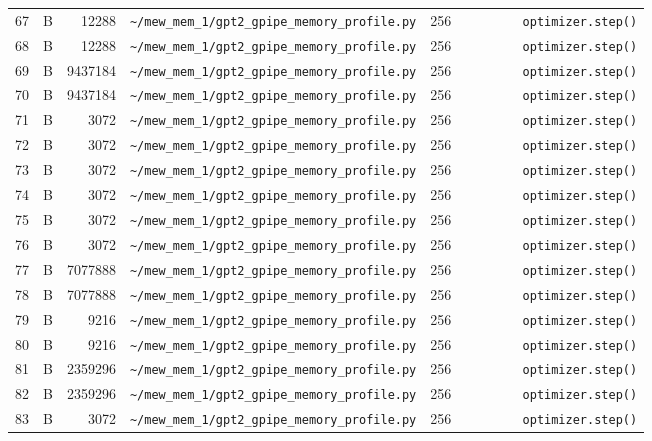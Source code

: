 \documentclass{article}
\begin{document}
\begin{longtable}{r l r p{6.5cm} r p{7.0cm}}
67 & B & 12288 & \lstinline|~/mew_mem_1/gpt2_gpipe_memory_profile.py| & 256 & \lstinline|        optimizer.step()| \\
68 & B & 12288 & \lstinline|~/mew_mem_1/gpt2_gpipe_memory_profile.py| & 256 & \lstinline|        optimizer.step()| \\
69 & B & 9437184 & \lstinline|~/mew_mem_1/gpt2_gpipe_memory_profile.py| & 256 & \lstinline|        optimizer.step()| \\
70 & B & 9437184 & \lstinline|~/mew_mem_1/gpt2_gpipe_memory_profile.py| & 256 & \lstinline|        optimizer.step()| \\
71 & B & 3072 & \lstinline|~/mew_mem_1/gpt2_gpipe_memory_profile.py| & 256 & \lstinline|        optimizer.step()| \\
72 & B & 3072 & \lstinline|~/mew_mem_1/gpt2_gpipe_memory_profile.py| & 256 & \lstinline|        optimizer.step()| \\
73 & B & 3072 & \lstinline|~/mew_mem_1/gpt2_gpipe_memory_profile.py| & 256 & \lstinline|        optimizer.step()| \\
74 & B & 3072 & \lstinline|~/mew_mem_1/gpt2_gpipe_memory_profile.py| & 256 & \lstinline|        optimizer.step()| \\
75 & B & 3072 & \lstinline|~/mew_mem_1/gpt2_gpipe_memory_profile.py| & 256 & \lstinline|        optimizer.step()| \\
76 & B & 3072 & \lstinline|~/mew_mem_1/gpt2_gpipe_memory_profile.py| & 256 & \lstinline|        optimizer.step()| \\
77 & B & 7077888 & \lstinline|~/mew_mem_1/gpt2_gpipe_memory_profile.py| & 256 & \lstinline|        optimizer.step()| \\
78 & B & 7077888 & \lstinline|~/mew_mem_1/gpt2_gpipe_memory_profile.py| & 256 & \lstinline|        optimizer.step()| \\
79 & B & 9216 & \lstinline|~/mew_mem_1/gpt2_gpipe_memory_profile.py| & 256 & \lstinline|        optimizer.step()| \\
80 & B & 9216 & \lstinline|~/mew_mem_1/gpt2_gpipe_memory_profile.py| & 256 & \lstinline|        optimizer.step()| \\
81 & B & 2359296 & \lstinline|~/mew_mem_1/gpt2_gpipe_memory_profile.py| & 256 & \lstinline|        optimizer.step()| \\
82 & B & 2359296 & \lstinline|~/mew_mem_1/gpt2_gpipe_memory_profile.py| & 256 & \lstinline|        optimizer.step()| \\
83 & B & 3072 & \lstinline|~/mew_mem_1/gpt2_gpipe_memory_profile.py| & 256 & \lstinline|        optimizer.step()| \\

\end{longtable}
\end{document}

